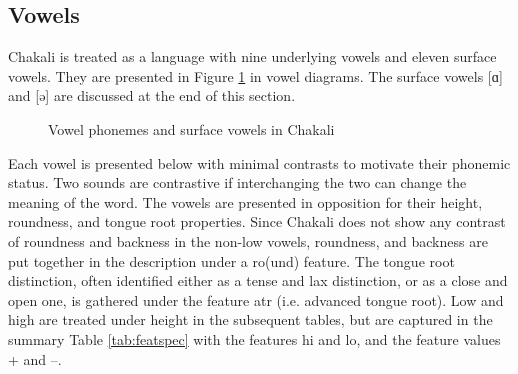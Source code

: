 
\subsection{Vowels}
\label{sec:vowels}

Chakali is treated as a language with nine underlying vowels and eleven
surface vowels. They
are presented in Figure \ref{fig:Phon-phon-srf} in  vowel diagrams.  The 
surface vowels  
[{\sls ɑ}]
and  [{\sls ə}] are discussed  at the end of this section. 


\begin{figure}[!htb]
\centering

\qquad
{}

\caption{Vowel phonemes and surface vowels in Chakali \label{fig:Phon-phon-srf}}
\end{figure}



Each vowel is presented below with minimal contrasts to motivate their phonemic
status.   Two sounds are contrastive if interchanging the two can change the
meaning of the word. The vowels are presented in opposition for their height,
roundness,  and tongue root properties. Since Chakali does not show any
contrast of roundness and backness in the non-low vowels, roundness, and 
backness
  are put together in the description under a {\sc ro}(und) feature. The tongue
root
distinction, often identified either as a tense and lax distinction, or as a
close and open one,  is gathered under the feature {\sc atr} (i.e. advanced
tongue root). Low and high are treated under {\sc height} in the
subsequent tables, but are captured in the summary Table \ref{tab:featspec}
with the features {\sc hi}   and {\sc lo},  and the feature values +
and --. 


